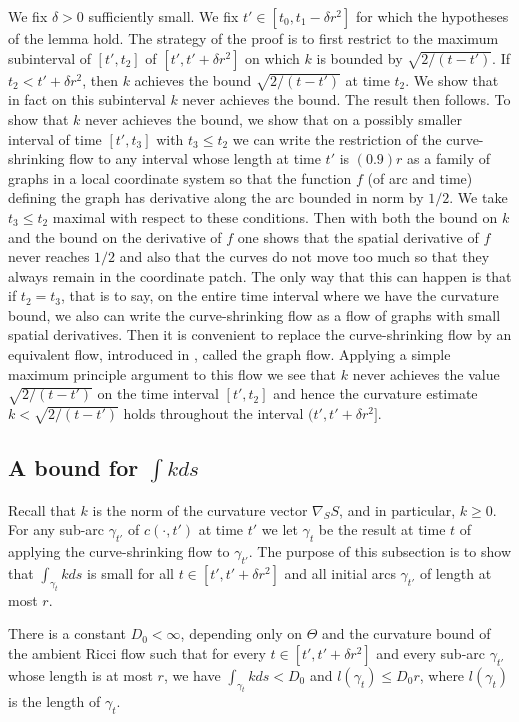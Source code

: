 We fix $\delta>0$ sufficiently small. We fix $t'\in [t_0,t_1-\delta
r^2]$ for which the hypotheses of the lemma hold.  The strategy of
the proof is to first restrict to the maximum subinterval of
$[t',t_2]$ of $[t',t'+\delta r^2]$ on which $k$ is bounded by
$\sqrt{2/(t-t')}$. If $t_2<t'+\delta r^2$, then $k$ achieves the
bound $\sqrt{2/(t-t')}$ at time $t_2$. We show that in fact on this
subinterval $k$ never achieves the bound. The result then follows.
To show that $k$ never achieves the bound, we show that on a
possibly smaller interval of time $[t',t_3]$ with $t_3\le t_2$ we
can write the restriction of the curve-shrinking flow to any
interval whose length at time $t'$ is $(0.9)r$ as a family of graphs
in a local coordinate system so that the function $f$ (of arc and
time) defining the graph has derivative along the arc bounded in
norm by $1/2$. We take $t_3\le t_2$ maximal with respect to these
conditions. Then with both the bound on $k$ and the bound on the
derivative of $f$ one shows that the spatial derivative of $f$ never
reaches $1/2$ and also that the curves do not move too much so that
they always remain in the coordinate patch. The only way that this
can happen is that if $t_2=t_3$, that is to say, on the entire time
interval where we have the curvature bound, we also can write the
curve-shrinking flow as a flow of graphs with small spatial
derivatives. Then it is convenient to replace the curve-shrinking
flow by an equivalent flow, introduced in \cite{AG}, called the
graph flow. Applying a simple maximum principle argument to this
flow we see that $k$ never achieves the value $\sqrt{2/(t-t')}$ on
the time interval $[t',t_2]$ and hence the curvature estimate
$k<\sqrt{2/(t-t')}$ holds throughout the interval $(t',t'+\delta
r^2]$.




\subsection{A bound for $\int kds$}

Recall that $k$ is the norm of the curvature vector $\nabla_SS$, and
in particular, $k\ge 0$. For any sub-arc $\gamma_{t'}$ of
$c(\cdot,t')$  at time $t'$ we let $\gamma_t$ be the result at time
$t$ of applying the curve-shrinking flow to $\gamma_{t'}$. The
purpose of this subsection is to show that $\int_{\gamma_t} kds$ is
small for all $t\in [t',t'+\delta r^2]$ and all initial arcs
$\gamma_{t'}$ of length at most $r$.



\begin{claim}
\label{claim:curve-shrinking-length-curvature-uniform-bound}
\label{C0claim}
There is a constant $D_0<\infty$, depending only on $\Theta$ and the
curvature bound of the ambient Ricci flow such that for every $t\in
[t',t'+\delta r^2]$ and every sub-arc $\gamma_{t'}$ whose length is
at most $r$, we have $\int_{\gamma_t} kds<D_0$ and $l(\gamma_t)\le
D_0r$, where $l(\gamma_t)$ is the length of $\gamma_t$.
\end{claim}



